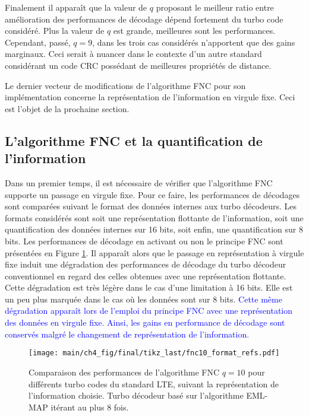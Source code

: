 Finalement il apparaît que la valeur de $q$ proposant le meilleur ratio entre amélioration des performances de décodage 
dépend fortement du turbo code considéré. Plus la valeur de $q$ est grande, meilleures sont les performances. Cependant,
passé, $q=9$, dans les trois cas considérés n'apportent que des gains marginaux. Ceci serait à nuancer dans le contexte 
d'un autre standard considérant un code CRC possédant de meilleures propriétés de distance.

Le dernier vecteur de modifications de l'algorithme FNC pour son implémentation concerne la représentation de 
l'information en virgule fixe. Ceci est l'objet de la prochaine section.

\subsection{L'algorithme FNC et la quantification de l'information}
Dans un premier temps, il est nécessaire de vérifier que l'algorithme FNC supporte un passage en virgule fixe. Pour ce 
faire, les performances de décodages sont comparées suivant le format des données internes aux turbo décodeurs. Les 
formats considérés sont soit une représentation flottante de l'information, soit une quantification des données internes 
sur 16 bits, soit enfin, une quantification sur 8 bits. Les performances de décodage en activant ou non le principe FNC 
sont présentées en Figure \ref{fig:fnc_format_refs}. Il apparaît alors que le passage en représentation à virgule fixe 
induit une dégradation des performances de décodage du turbo décodeur conventionnel en regard des celles obtenues avec 
une représentation flottante. Cette dégradation est très légère dans le cas d'une limitation à 16 bits. Elle est un peu 
plus marquée dans le cas où les données sont sur 8 bits. \textcolor{blue}{Cette même dégradation apparaît lors de 
l'emploi du principe FNC avec une représentation des données en virgule fixe. Ainsi, les gains en performance de 
décodage sont conservés malgré le changement de représentation de l'information.}

\begin{figure}[!h]
	\centering
	\texttt{[image: main/ch4\_fig/final/tikz\_last/fnc10\_format\_refs.pdf]}
	\caption{Comparaison des performances de l'algorithme FNC $q=10$ pour différents turbo codes du standard LTE, 
	suivant la représentation de l'information choisie.
	Turbo décodeur basé sur l'algorithme EML-MAP itérant au plus 8 fois.
	\label{fig:fnc_format_refs}}
\end{figure}

